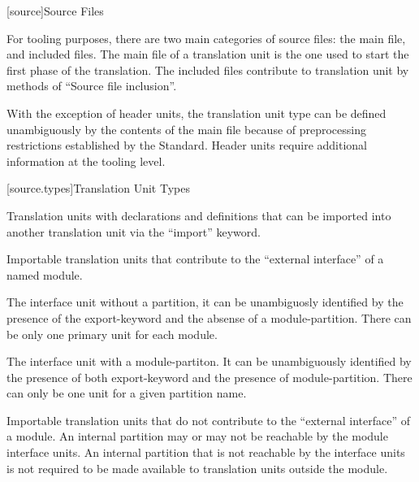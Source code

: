 
[source]{Source Files}

%

\pnum For tooling purposes, there are two main categories of source
files: the main file, and included files. The main file of a
translation unit is the one used to start the first phase of the
translation.  The included files contribute to translation unit by
methods of ``Source file inclusion''.

\pnum With the exception of header units, the translation unit type
can be defined unambiguously by the contents of the main file because
of preprocessing restrictions established by the \Cpp{}
Standard. Header units require additional information at the tooling
level.

[source.types]{Translation Unit Types}

%
%
%
Translation units with declarations and definitions that can be
imported into another translation unit via the ``import'' keyword.

%
%
%
Importable translation units that contribute to the ``external
interface'' of a named module.

%
%
%
The interface unit without a partition, it can be unambiguosly
identified by the presence of the export-keyword and the absense of a
module-partition. There can be only one primary unit for each module.

%
%
%
The interface unit with a module-partiton. It can be unambiguously
identified by the presence of both export-keyword and the presence of
module-partition. There can only be one unit for a given partition
name.

%
%
%
Importable translation units that do not contribute to the ``external
interface'' of a module. An internal partition may or may not be
reachable by the module interface units. An internal partition that is
not reachable by the interface units is not required to be made
available to translation units outside the module.

